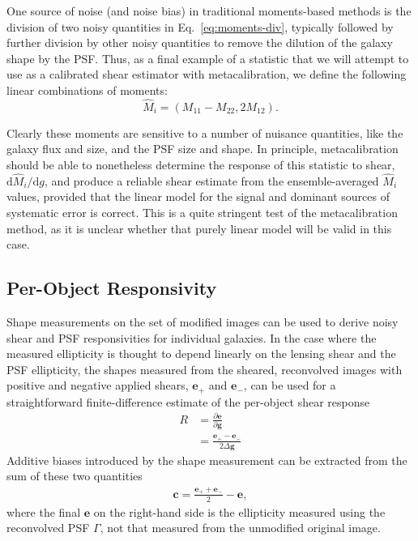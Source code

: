 \documentclass[iop]{emulateapj}
\begin{document}
One source of noise (and noise bias) in traditional moments-based methods is the
division of two noisy quantities in Eq.~\ref{eq:moments-div},
typically followed by further division by other noisy quantities to
remove the dilution of the galaxy shape by the PSF.  Thus, as a final
example of a statistic that we will attempt to use as a calibrated
shear estimator with metacalibration, we define the following linear
combinations of moments:
\begin{equation}
\hat{M}_i = (M_{11}-M_{22}, 2M_{12}).
\end{equation}

Clearly these moments are sensitive to a number of nuisance
quantities, like the galaxy flux and size, and the PSF size and shape.
In principle, metacalibration should be able to nonetheless determine
the response of this statistic to shear,
$\mathrm{d}\hat{M}_i/\mathrm{d}g$, and produce a reliable shear
estimate from the ensemble-averaged $\hat{M}_i$ values, provided that
the linear model for the signal and dominant sources of systematic
error is correct.  This is a quite stringent test of the
metacalibration method, as it is unclear whether that purely linear
model will be valid in this case.

\subsection{Per-Object Responsivity}
Shape measurements on the set of modified images can be used to derive
noisy shear and PSF responsivities for individual galaxies. In the
case where the measured ellipticity is thought to depend linearly on
the lensing shear and the PSF ellipticity, the shapes measured from
the sheared, reconvolved images with positive and negative applied
shears, $\mathbf{e}_+$ and $\mathbf{e}_-$, can be used for a
straightforward finite-difference estimate of the per-object shear
response
\begin{align}
R &= \frac{\partial \mathbf{e}}{\partial \mathbf{g}}  \\
 &=\frac{\mathbf{e}_{+} - \mathbf{e}_{-}}{2\Delta\mathbf{g}}
\end{align}
Additive biases introduced by the shape measurement can be extracted from the
sum of these two quantities
\begin{align}
\mathbf{c} = \frac{\mathbf{e}_+ + \mathbf{e}_-}{2} - \mathbf{e},
\end{align}
where the final $\mathbf{e}$ on the right-hand side is the ellipticity
measured using the reconvolved PSF $\Gamma$, not that measured from
the unmodified original image.
\end{document}
